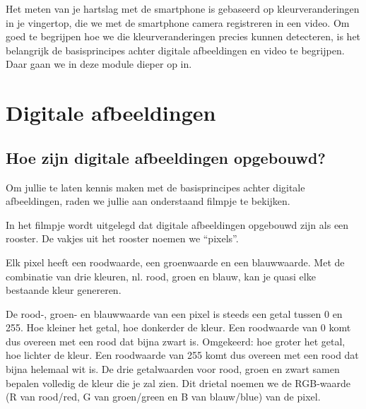 
\begin{samenvatting}
Het meten van je hartslag met de smartphone is gebaseerd op kleurveranderingen in je vingertop, die we met de smartphone camera registreren in een video. Om goed te begrijpen hoe we die kleurveranderingen precies kunnen detecteren, is het belangrijk de basisprincipes achter digitale afbeeldingen en video te begrijpen. Daar gaan we in deze module dieper op in.
\end{samenvatting}
%

\section{Digitale afbeeldingen}
\label{sec:Mod3_Sec1}
%

\subsection{Hoe zijn digitale afbeeldingen opgebouwd?}

Om jullie te laten kennis maken met de basisprincipes achter digitale afbeeldingen, raden we jullie aan onderstaand filmpje te bekijken.


In het filmpje wordt uitgelegd dat digitale afbeeldingen opgebouwd zijn als een rooster. De vakjes uit het rooster noemen we \textquotedblleft pixels\textquotedblright. 

Elk pixel heeft een roodwaarde, een groenwaarde en een blauwwaarde. Met de combinatie van drie kleuren, nl. rood, groen en blauw, kan je quasi elke bestaande kleur genereren. 

De rood-, groen- en blauwwaarde van een pixel is steeds een getal tussen 0 en 255. Hoe kleiner het getal, hoe donkerder de kleur. Een roodwaarde van 0 komt dus overeen met een rood dat bijna zwart is. Omgekeerd: hoe groter het getal, hoe lichter de kleur. Een roodwaarde van 255 komt dus overeen met een rood dat bijna helemaal wit is. De drie getalwaarden voor rood, groen en zwart samen bepalen volledig de kleur die je zal zien. Dit drietal noemen we de RGB-waarde (R van rood/red, G van groen/green en B van blauw/blue) van de pixel.

